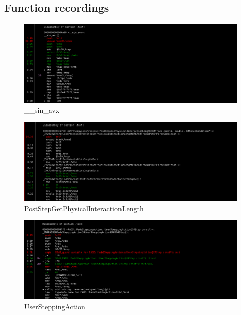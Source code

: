 \documentclass[a4paper]{jpconf}
\begin{document}
\begin{appendices}

\section{Function recordings}
\label{appending:function-recording}
\begin{figure}[H]
\begin{center}
\includegraphics[scale=0.35]{images/sin_P8.png}
\caption{\_\_sin\_avx}
\end{center}
\end{figure}

\begin{figure}[H]
\begin{center}
\includegraphics[scale=0.35]{images/Post_step_P8.png}
\caption{PostStepGetPhysicalInteractionLength}
\end{center}
\end{figure}

\begin{figure}[H]
\begin{center}
\includegraphics[scale=0.35]{images/UserStepping_P8.png}
\caption{UserSteppingAction}
\end{center}
\end{figure}


\end{appendices}
\end{document}
